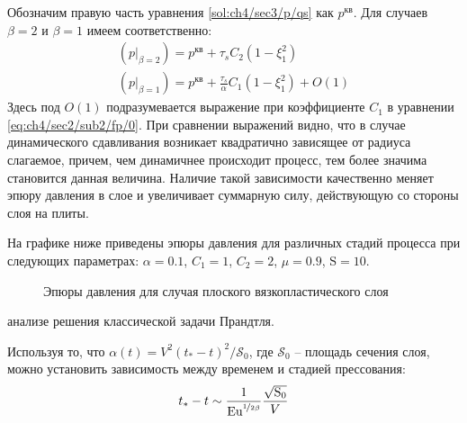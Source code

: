 Обозначим правую часть уравнения \cref{sol:ch4/sec3/p/qs} как $p^\text{кв}$. Для случаев $\beta=2$ и $\beta=1$ имеем соответственно:
\begin{gather}
  \left(p\lvert_{\beta=2}\right) = p^\text{кв} + \tau_{s} C_2 \left(1-\xi_1^2\right)
  \\
  \left(p\lvert_{\beta=1}\right) = p^\text{кв} + \frac{\tau_{s}}{\alpha} C_1 \left(1-\xi_1^2\right) + O(1)
\end{gather}
Здесь под $O(1)$ подразумевается выражение при коэффициенте $C_1$ в уравнении \cref{eq:ch4/sec2/sub2/fp/0}.
При сравнении выражений видно, что в случае динамического сдавливания возникает квадратично зависящее от радиуса слагаемое, причем, чем динамичнее происходит процесс, тем более значима становится данная величина. Наличие такой зависимости качественно меняет эпюру давления в слое и увеличивает суммарную силу, действующую со стороны слоя на плиты.

На графике ниже приведены эпюры давления для различных стадий процесса при следующих параметрах: $\alpha=0.1$, $C_1=1$, $C_2=2$, $\mu=0.9$, $\text{S}=10$.
\begin{figure}[ht]
  \caption{Эпюры давления для случая плоского вязкопластического слоя}
  \label{fig:ch4/pressure}
\end{figure}анализе решения классической задачи Прандтля.

Используя то, что $\alpha(t) = V^2\left(t_*-t\right)^2 / \mathcal{\text{S}}_0$, где $\mathcal{\text{S}}_0$ -- площадь сечения слоя, можно установить зависимость между временем и стадией прессования:
\begin{equation}
  t_* - t \sim \frac{1}{\text{Eu}^{\nicefrac{1}{2\beta}}}\frac{\sqrt{\mathcal{\text{S}}_0}}{V}
\end{equation}
